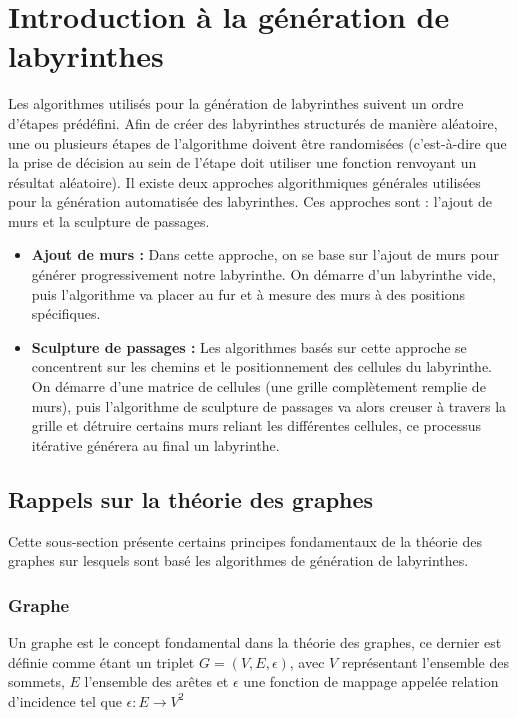 \section{Introduction à la génération de labyrinthes}
Les algorithmes utilisés pour la génération de labyrinthes suivent un ordre d'étapes prédéfini. Afin de créer des labyrinthes structurés de manière aléatoire, une ou plusieurs étapes de l'algorithme doivent être randomisées (c'est-à-dire que la prise de décision au sein de l'étape doit utiliser une fonction renvoyant un résultat aléatoire). 
Il existe deux approches algorithmiques générales utilisées pour la génération automatisée des labyrinthes. Ces approches sont : l'ajout de murs et la sculpture de passages.
\\
\begin{itemize}
\item\textbf{ Ajout de murs :} Dans cette approche, on se base sur l'ajout de murs pour générer progressivement notre labyrinthe. On démarre d'un labyrinthe vide, puis l'algorithme va placer au fur et à mesure des murs à des positions spécifiques. 
\\
\item\textbf{ Sculpture de passages :} Les algorithmes basés sur cette approche se concentrent sur les chemins et le positionnement des cellules du labyrinthe. On démarre d'une matrice de cellules (une grille complètement remplie de murs), puis l'algorithme de sculpture de passages va alors creuser à travers la grille et détruire certains murs reliant les différentes cellules, ce processus itérative générera au final un labyrinthe.
\end{itemize}



\subsection{Rappels sur la théorie des graphes}
Cette sous-section présente certains principes fondamentaux de la théorie des graphes sur lesquels sont basé les algorithmes de génération de labyrinthes. 
\subsubsection{Graphe}
Un graphe est le concept fondamental dans la théorie des graphes, ce dernier est définie comme étant un triplet  $G = (V, E, \epsilon )$, avec $V$ représentant l'ensemble des sommets, $E$  l'ensemble des arêtes et $\epsilon$ une fonction de mappage appelée relation d'incidence tel que $\epsilon : E	\rightarrow V^2$

